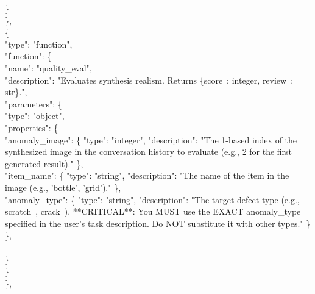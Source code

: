 \documentclass[sigconf]{acmart}
\begin{document}
\begin{tcolorbox}
\hspace*{2em}\} \\
\hspace*{1em}\}, \\
\hspace*{1em}\{ \\
\hspace*{2em}"type": "function", \\
\hspace*{2em}"function": \{ \\
\hspace*{3em}"name": "quality\_eval", \\
\hspace*{3em}"description": "Evaluates synthesis realism. Returns \{\textquotesingle score\textquotesingle \ : integer, \textquotesingle review\textquotesingle \ : str\}.", \\
\hspace*{3em}"parameters": \{ \\
\hspace*{4em}"type": "object", \\
\hspace*{4em}"properties": \{ \\
\hspace*{5em}"anomaly\_image": \{ "type": "integer", "description": "The 1-based index of the synthesized image in the conversation history to evaluate (e.g., 2 for the first generated result)." \}, \\
\hspace*{5em}"item\_name": \{ "type": "string", "description": "The name of the item in the image (e.g., 'bottle', 'grid')." \}, \\
\hspace*{5em}"anomaly\_type": \{ "type": "string", "description": "The target defect type (e.g., \textquotesingle scratch\textquotesingle \ , \textquotesingle crack\textquotesingle \ ). **CRITICAL**: You MUST use the EXACT anomaly\_type specified in the user's task description. Do NOT substitute it with other types." \} \\
\hspace*{4em}\}, \\
\hspace*{4em}{"required": ["anomaly\_image", "item\_name", "anomaly\_type"]} \\
\hspace*{3em}\} \\
\hspace*{2em}\} \\
\hspace*{1em}\}, \\

\end{tcolorbox}
\end{document}

